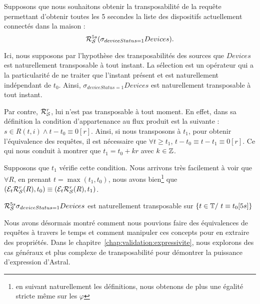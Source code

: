 \begin{example}\label{ex:transposabilite} 
    Supposons que nous souhaitons obtenir la transposabilité de la requête permettant d'obtenir toutes les 5 secondes la liste des dispositifs actuellement connectés dans la maison : $$\mathcal{R}_{\mathcal S}^{5s} (\sigma_{deviceStatus=1} Devices).$$

    Ici, nous supposons par l'hypothèse des transposabilités des sources que $Devices$ est naturellement transposable à tout instant. La sélection est un opérateur qui a la particularité de ne traiter que l'instant présent et est naturellement indépendant de $t_0$. Ainsi, $\sigma_{deviceStatus=1} Devices$ est naturellement transposable à tout instant.

    Par contre, $\mathcal{R}_{\mathcal S}^{r}$, lui n'est pas transposable à tout moment. En effet, dans sa définition la condition d'appartenance au flux produit est la suivante : $s \in R(t,i)\wedge t-t_0 \equiv 0[r]$. Ainsi, si nous transposons à $t_1$, pour obtenir l'équivalence des requêtes, il est nécessaire que $\forall t \geq t_1$, $t-t_0\equiv t-t_1\equiv 0[r]$.  Ce qui nous conduit à montrer que $t_1 = t_0 +kr$ avec $k\in \mathbb{Z}$. 

    Supposons que $t_1$ vérifie cette condition. Nous arrivons très facilement à voir que $\forall R$, en prenant $t=\max(t_1,t_0)$, nous avons bien\footnote{en suivant naturellement les définitions, nous obtenons de plus une égalité stricte même sur les $\varphi$} que $(\mathcal{E}_{t}\mathcal{R}_{\mathcal S}^{r}(R),t_0) \equiv (\mathcal{E}_{t}\mathcal{R}_{\mathcal S}^{r}(R),t_1)$.
    \begin{center}$\mathcal{R}_{\mathcal S}^{5s}\sigma_{deviceStatus=1} Devices$ est naturellement transposable sur $\{t\in \mathbb{T} /\ t\equiv t_0 [5s]\}$\end{center}
\end{example}

Nous avons désormais montré comment nous pouvions faire des équivalences de requêtes à travers le temps et comment manipuler ces concepts pour en extraire des propriétés. Dans le chapitre~\ref{chap:validation:expressivite}, nous explorons des cas généraux et plus complexe de transposabilité pour démontrer la puissance d'expression d'Astral.
